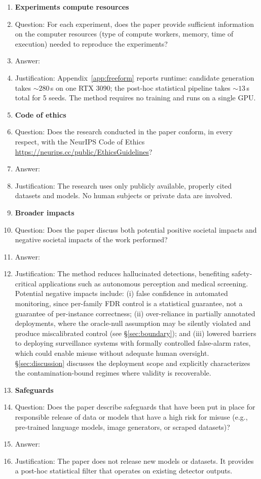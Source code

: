 \begin{enumerate}
\item {\bf Experiments compute resources}
    \item[] Question: For each experiment, does the paper provide sufficient information on the computer resources (type of compute workers, memory, time of execution) needed to reproduce the experiments?
    \item[] Answer: \answerYes{}
    \item[] Justification: Appendix~\ref{app:freeform} reports runtime: candidate generation takes ${\sim}280$\,s on one RTX 3090; the post-hoc statistical pipeline takes ${\sim}13$\,s total for 5 seeds. The method requires no training and runs on a single GPU.

\item {\bf Code of ethics}
    \item[] Question: Does the research conducted in the paper conform, in every respect, with the NeurIPS Code of Ethics \url{https://neurips.cc/public/EthicsGuidelines}?
    \item[] Answer: \answerYes{}
    \item[] Justification: The research uses only publicly available, properly cited datasets and models. No human subjects or private data are involved.

\item {\bf Broader impacts}
    \item[] Question: Does the paper discuss both potential positive societal impacts and negative societal impacts of the work performed?
    \item[] Answer: \answerYes{}
    \item[] Justification: The method reduces hallucinated detections, benefiting safety-critical applications such as autonomous perception and medical screening. Potential negative impacts include: (i) false confidence in automated monitoring, since per-family FDR control is a statistical guarantee, not a guarantee of per-instance correctness; (ii) over-reliance in partially annotated deployments, where the oracle-null assumption may be silently violated and produce miscalibrated control (see \S\ref{sec:boundary}); and (iii) lowered barriers to deploying surveillance systems with formally controlled false-alarm rates, which could enable misuse without adequate human oversight. \S\ref{sec:discussion} discusses the deployment scope and explicitly characterizes the contamination-bound regimes where validity is recoverable.

\item {\bf Safeguards}
    \item[] Question: Does the paper describe safeguards that have been put in place for responsible release of data or models that have a high risk for misuse (e.g., pre-trained language models, image generators, or scraped datasets)?
    \item[] Answer: \answerNA{}
    \item[] Justification: The paper does not release new models or datasets. It provides a post-hoc statistical filter that operates on existing detector outputs.


\end{enumerate}
